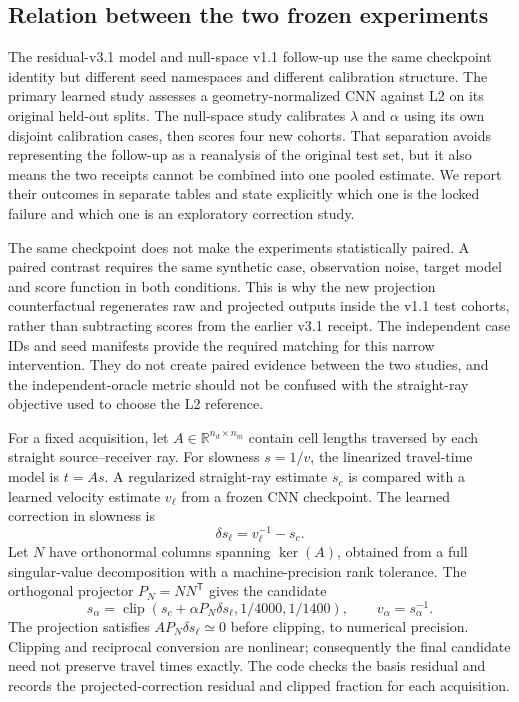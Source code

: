 \documentclass[11pt]{article}
\begin{document}
\subsection{Relation between the two frozen experiments}
The residual-v3.1 model and null-space v1.1 follow-up use the same checkpoint identity but different seed namespaces and different calibration structure. The primary learned study assesses a geometry-normalized CNN against L2 on its original held-out splits. The null-space study calibrates $\lambda$ and $\alpha$ using its own disjoint calibration cases, then scores four new cohorts. That separation avoids representing the follow-up as a reanalysis of the original test set, but it also means the two receipts cannot be combined into one pooled estimate. We report their outcomes in separate tables and state explicitly which one is the locked failure and which one is an exploratory correction study.

The same checkpoint does not make the experiments statistically paired. A paired contrast requires the same synthetic case, observation noise, target model and score function in both conditions. This is why the new projection counterfactual regenerates raw and projected outputs inside the v1.1 test cohorts, rather than subtracting scores from the earlier v3.1 receipt. The independent case IDs and seed manifests provide the required matching for this narrow intervention. They do not create paired evidence between the two studies, and the independent-oracle metric should not be confused with the straight-ray objective used to choose the L2 reference.

For a fixed acquisition, let $A\in\mathbb{R}^{n_d\times n_m}$ contain cell lengths traversed by each straight source--receiver ray. For slowness $s=1/v$, the linearized travel-time model is $t=As$. A regularized straight-ray estimate $s_c$ is compared with a learned velocity estimate $v_\ell$ from a frozen CNN checkpoint. The learned correction in slowness is
\[
  \delta s_\ell = v_\ell^{-1}-s_c.
\]
Let $N$ have orthonormal columns spanning $\ker(A)$, obtained from a full singular-value decomposition with a machine-precision rank tolerance. The orthogonal projector $P_N=NN^\mathsf{T}$ gives the candidate
\[
  s_\alpha = \operatorname{clip}\!\left(s_c+\alpha P_N\delta s_\ell,
                 1/4000,1/1400\right), \qquad v_\alpha=s_\alpha^{-1}.
\]
The projection satisfies $A P_N\delta s_\ell\simeq 0$ before clipping, to numerical precision. Clipping and reciprocal conversion are nonlinear; consequently the final candidate need not preserve travel times exactly. The code checks the basis residual and records the projected-correction residual and clipped fraction for each acquisition.
\end{document}
